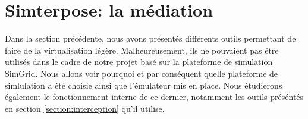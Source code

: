 \section{Simterpose: la médiation}
\label{section:simterpose}

Dans la section précédente, nous avons présentés différents outils permettant de
faire de la virtualisation légère. Malheureusement, ils ne pouvaient pas être
utilisés dans le cadre de notre projet basé sur la plateforme de simulation
SimGrid. Nous allons voir pourquoi et par conséquent quelle plateforme de
simlulation a été choisie ainsi que l'émulateur mis en place. Nous étudierons
également le fonctionnement interne de ce dernier, notamment les outils
préséntés en section \ref{section:interception} qu'il utilise.
